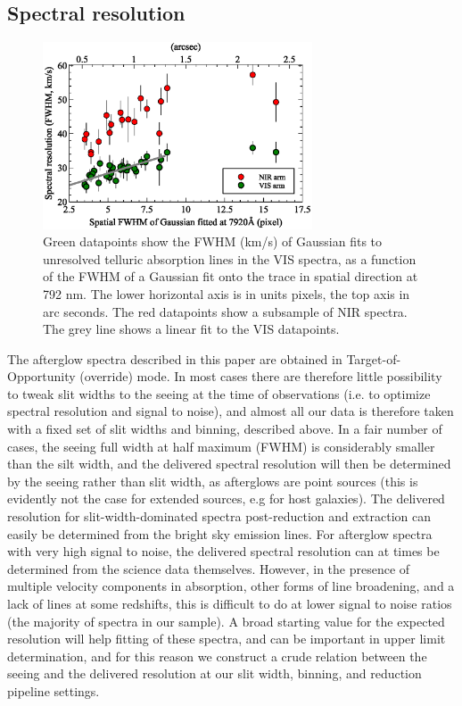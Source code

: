 \documentclass{aa}    %
\begin{document}
\subsection{Spectral resolution} \label{resolution}


\begin{figure}[!ht]
	\centerline{\includegraphics[width=8cm]{figures/resolution_paper.eps}}
	\caption{Green datapoints show the FWHM (km/s) of Gaussian fits to unresolved telluric absorption lines in the VIS spectra, as a function of the FWHM of a Gaussian fit onto the trace in spatial direction at  792 nm. The lower horizontal axis is in units pixels, the top axis in arc seconds. The red datapoints show a subsample of NIR spectra.
		The grey line shows a linear fit to the VIS datapoints. }
	\label{fig:res}
\end{figure}


The afterglow spectra described in this paper are obtained in
Target-of-Opportunity (override) mode. In most cases there are therefore little
possibility to tweak slit widths to the seeing at the time of observations (i.e.
to optimize spectral resolution and signal to noise), and almost all our data is
therefore taken with a fixed set of slit widths and binning, described above. In
a fair number of cases, the seeing full width at half maximum (FWHM) is
considerably smaller than the silt width, and the delivered spectral resolution
will then be determined by the seeing rather than slit width, as afterglows are
point sources (this is evidently not the case for extended sources, e.g for host
galaxies). The delivered resolution for slit-width-dominated spectra
post-reduction and extraction can easily be determined from the bright sky
emission lines. For afterglow spectra with very high signal to noise, the
delivered spectral resolution can at times be determined from the science data
themselves. However, in the presence of multiple velocity components in
absorption, other forms of line broadening, and a lack of lines at some
redshifts, this is difficult to do at lower signal to noise ratios (the
majority of spectra in our sample). A broad starting value for the expected
resolution will help fitting of these spectra, and can be important in upper
limit determination, and for this reason we construct a crude relation between
the seeing and the delivered resolution at our slit width, binning, and
reduction pipeline settings. 
\end{document}
